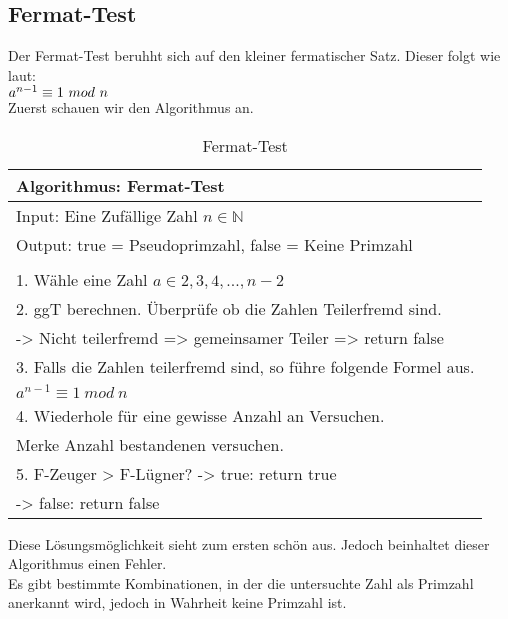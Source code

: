 \subsection{Fermat-Test}

Der Fermat-Test beruhht sich auf den kleiner fermatischer Satz. Dieser folgt wie laut:
\\
$
                    a^{n-1} \equiv  1\ mod\ n\\
$
\\
Zuerst schauen wir den Algorithmus an.\\
\begin{table}[!ht]
    \centering
        \begin{tabular}{l}
            \toprule
            \textbf{Algorithmus: Fermat-Test}\\
            \midrule
            Input: Eine Zufällige Zahl $n \in \mathbb{N} $\\
            Output: true = Pseudoprimzahl, false = Keine Primzahl  \\
                                                       \\
                                                       
            1. Wähle eine Zahl $ a \in {2,3,4,...,n-2}$ \\
            2. ggT berechnen. Überprüfe ob die Zahlen Teilerfremd sind.\\ 
                -> Nicht teilerfremd => gemeinsamer Teiler => return false \\
            3. Falls die Zahlen teilerfremd sind, so führe folgende Formel aus.\\
                $
                    a^{n-1} \equiv  1\ mod\ n
                $\\
            4. Wiederhole für eine gewisse Anzahl an Versuchen.\\
                Merke Anzahl bestandenen versuchen.\\
                
            5. F-Zeuger > F-Lügner?    
            -> true: return true \\
            -> false: return false\\
           \bottomrule
        \end{tabular}
        \caption{Fermat-Test}
        \label{tab3}
    \end{table}

Diese Lösungsmöglichkeit sieht zum ersten schön aus. Jedoch beinhaltet dieser Algorithmus einen Fehler.\\
Es gibt bestimmte Kombinationen, in der die untersuchte Zahl als Primzahl anerkannt wird, jedoch in Wahrheit keine Primzahl ist.\\

